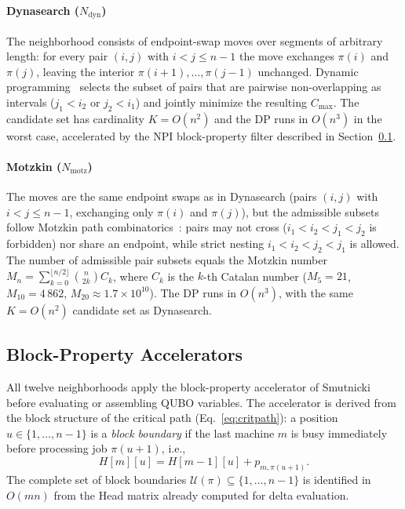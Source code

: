 \documentclass[preprint,12pt,authoryear]{elsarticle}
\begin{document}
\paragraph{Dynasearch \textup{($N_{\mathrm{dyn}}$)}}
The neighborhood consists of endpoint-swap moves over segments of
arbitrary length: for every pair $(i,j)$ with $i < j \leq n-1$ the move exchanges
$\pi(i)$ and $\pi(j)$, leaving the interior $\pi(i+1),\ldots,\pi(j-1)$
unchanged. Dynamic programming~\citep{congram02} selects the subset
of pairs that are pairwise non-overlapping as intervals
($j_1 < i_2$ or $j_2 < i_1$) and jointly minimize the resulting
$C_{\max}$. The candidate set has cardinality $K = O(n^2)$ and the DP
runs in $O(n^3)$ in the worst case, accelerated by the NPI block-property
filter described in Section~\ref{sec:accelerators}.

\paragraph{Motzkin \textup{($N_{\mathrm{motz}}$)}}
The moves are the same endpoint swaps as in Dynasearch (pairs $(i,j)$
with $i < j \leq n-1$, exchanging only $\pi(i)$ and $\pi(j)$), but the
admissible subsets follow Motzkin path
combinatorics~\citep{motzkin1948,Motzkin_PWR,Motzkin_PWR_EXIT}: pairs may not cross
($i_1 < i_2 < j_1 < j_2$ is forbidden) nor share an endpoint, while
strict nesting $i_1 < i_2 < j_2 < j_1$ is allowed. The number of
admissible pair subsets equals the Motzkin number
$M_n = \sum_{k=0}^{\lfloor n/2 \rfloor}\binom{n}{2k}C_k$, where $C_k$
is the $k$-th Catalan number
($M_5 = 21$, $M_{10} = 4\,862$, $M_{20} \approx 1.7 \times 10^{10}$).
The DP runs in $O(n^3)$, with the same $K = O(n^2)$ candidate set as
Dynasearch.

\subsection{Block-Property Accelerators}
\label{sec:accelerators}

All twelve neighborhoods apply the block-property accelerator of
Smutnicki~\citep{ref_smutnicki} before evaluating or assembling QUBO
variables. The accelerator is derived from the block structure of the
critical path (Eq.~\eqref{eq:critpath}): a position
$u \in \{1,\ldots,n-1\}$ is a \emph{block boundary} if the last
machine $m$ is busy immediately before processing job $\pi(u+1)$, i.e.,
\begin{equation}
  H[m][u] = H[m-1][u] + p_{m,\pi(u+1)}.
  \label{eq:boundary}
\end{equation}
The complete set of block boundaries $\mathcal{U}(\pi) \subseteq
\{1,\ldots,n-1\}$ is identified in $O(mn)$ from the Head matrix
already computed for delta evaluation.
\end{document}
